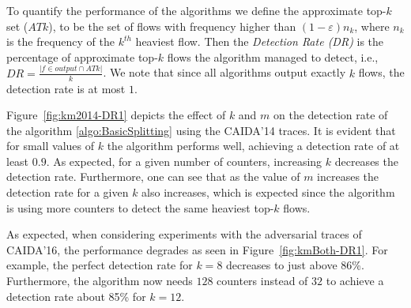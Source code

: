 To quantify the performance of the algorithms we define the approximate top-$k$ set ($ATk$), to be the set of flows with frequency higher than $(1-\varepsilon)n_k$, where $n_k$ is the frequency of the $k^{th}$ heaviest flow.
Then the \textit{Detection Rate (DR)} is the percentage of approximate top-$k$ flows the algorithm managed to detect, i.e., $DR=\frac{|f\in output\cap ATk|}{k}$. We note that since all algorithms output exactly $k$ flows, the detection rate is at most $1$.

Figure~\ref{fig:km2014-DR1} depicts the effect of $k$ and $m$ on the detection rate of the algorithm \ref{algo:BasicSplitting} using the CAIDA'14 traces. It is evident that for small values of $k$ the algorithm performs well, achieving a detection rate of at least $0.9$. As expected, for a given number of counters, increasing $k$ decreases the detection rate.
Furthermore, one can see that as the value of $m$ increases the detection rate for a given $k$ also increases, which is expected since the algorithm is using more counters to detect the same heaviest top-$k$ flows.

As expected, when considering experiments with the adversarial traces of CAIDA'16, the performance degrades as seen in Figure~\ref{fig:kmBoth-DR1}. For example, the perfect detection rate for $k=8$ decreases to just above 86\%. Furthermore, the algorithm now needs $128$ counters instead of $32$ to achieve a detection rate about 85\% for $k=12$.

